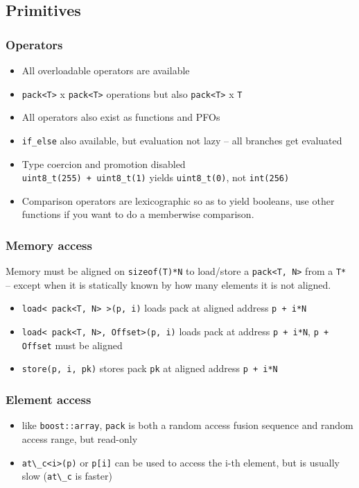 \documentclass{beamer}
\begin{document}
\subsection{Primitives}

\begin{frame}
	\frametitle{Operators}
	
	\begin{itemize}
		\item All overloadable operators are available
		\item \lstinline{pack<T>} x \lstinline{pack<T>} operations but also \lstinline{pack<T>} x \lstinline{T}
		\item All operators also exist as functions and PFOs
		\item \lstinline{if_else} also available, but evaluation not lazy -- all branches get evaluated
		\item Type coercion and promotion disabled\\
		      \lstinline{uint8_t(255) + uint8_t(1)} yields \lstinline{uint8_t(0)}, not \lstinline{int(256)}
		\item Comparison operators are lexicographic so as to yield booleans,
		      use other functions if you want to do a memberwise comparison.
	\end{itemize}	
	
\end{frame}

\begin{frame}
	\frametitle{Memory access}
	
	Memory must be aligned on \lstinline{sizeof(T)*N} to load/store a \lstinline{pack<T, N>}
	from a \lstinline{T*}\\
	-- except when it is statically known by how many elements it is not aligned.
	
	\begin{itemize}
		\item \lstinline{load< pack<T, N> >(p, i)} loads pack at aligned address \lstinline{p + i*N}
		\item \lstinline{load< pack<T, N>, Offset>(p, i)} loads pack at address \lstinline{p + i*N}, \lstinline{p + Offset} must be aligned
		\item \lstinline{store(p, i, pk)} stores pack \lstinline{pk} at aligned address \lstinline{p + i*N}
	\end{itemize}
\end{frame}

\begin{frame}
	\frametitle{Element access}
	
	\begin{itemize}
		\item like \lstinline{boost::array}, \lstinline{pack} is both a random access fusion sequence and random access range, but read-only
		\item \lstinline{at\_c<i>(p)} or \lstinline{p[i]} can be used to access the i-th element, but is usually slow (\lstinline{at\_c} is faster)
	\end{itemize}
	
\end{frame}
\end{document}

